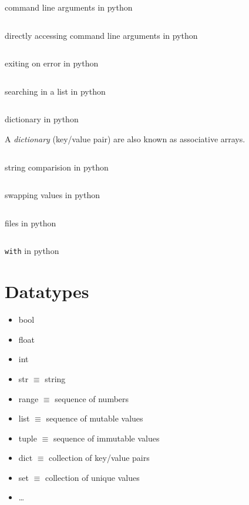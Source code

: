 \begin{code}
	\inputminted{python}{codes/src6/2/argv0.py}
	\caption{command line arguments in python}
\end{code}
\clearpage
\begin{code}
	\inputminted{python}{codes/src6/2/argv1.py}
	\caption{directly accessing command line arguments in python}
\end{code}
\begin{code}
	\inputminted{python}{codes/src6/2/exit0.py}
	\caption{exiting on error in python}
\end{code}
\begin{code}
	\inputminted{python}{codes/src6/3/names.py}
	\caption{searching in a list in python}
\end{code}
\begin{code}
	\inputminted{python}{codes/src6/3/phonebook.py}
	\caption{dictionary in python}
\end{code}
\begin{remark}
	A \emph{dictionary} (key/value pair) are also known as associative arrays.
\end{remark}
\begin{code}
	\inputminted{python}{codes/src6/4/compare.py}
	\caption{string comparision in python}
\end{code}
\clearpage
\begin{code}
	\inputminted{python}{codes/src6/4/swap.py}
	\caption{swapping values in python}
\end{code}
\begin{code}
	\inputminted{python}{codes/src6/4/phonebook0.py}
	\caption{files in python}
\end{code}
\begin{code}
	\inputminted{python}{codes/src6/4/phonebook1.py}
	\caption{\texttt{with} in python}
\end{code}

\section{Datatypes}
\begin{itemize}
	\item bool
	\item float
	\item int
	\item str $\equiv$ string
	\item range $\equiv$ sequence of numbers
	\item list $\equiv$ sequence of mutable values
	\item tuple $\equiv$ sequence of immutable values
	\item dict $\equiv$ collection of key/value pairs
	\item set $\equiv$ collection of unique values
	\item \dots
\end{itemize}

